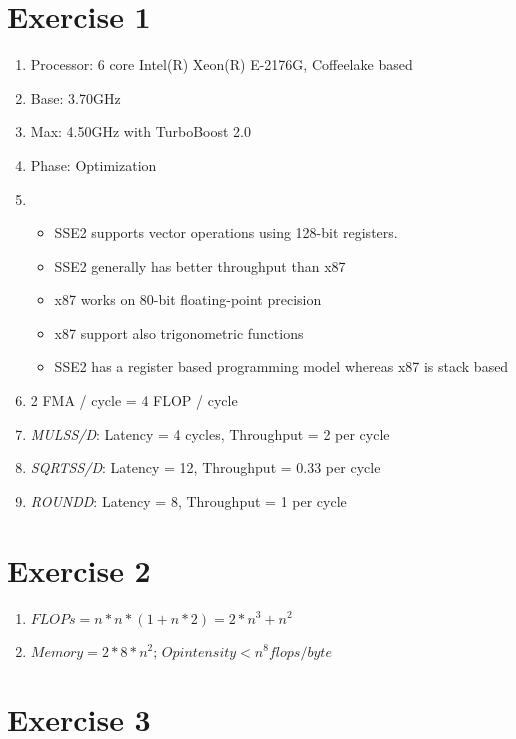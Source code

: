 \documentclass{article}
\begin{document}
\section{Exercise 1}
\begin{enumerate}[label=(\alph*)]
    \item Processor: 6 core Intel(R) Xeon(R) E-2176G, Coffeelake based
    \item Base: 3.70GHz
    \item Max: 4.50GHz with TurboBoost 2.0
    \item Phase: Optimization
    \item \begin{itemize}
        \item SSE2 supports vector operations using 128-bit registers.
        \item SSE2 generally has better throughput than x87
        \item x87 works on 80-bit floating-point precision
        \item x87 support also trigonometric functions
        \item SSE2 has a register based programming model whereas x87 is stack based
    \end{itemize}
    \item 2 FMA / cycle = 4 FLOP / cycle
    \item \textit{MULSS/D}: Latency = 4 cycles, Throughput = 2 per cycle
    \item \textit{SQRTSS/D}: Latency = 12, Throughput = 0.33 per cycle
    \item \textit{ROUNDD}: Latency = 8, Throughput = 1 per cycle
\end{enumerate}

\section{Exercise 2}

\begin{enumerate}[label=(\alph*)]
    \item $FLOPs = n * n * (1 + n * 2) = 2 * n^3 + n^2$
    \item $Memory = 2 * 8 * n^2$; $Op intensity < n^8 flops/byte$
\end{enumerate}


\section{Exercise 3}
\end{document}
